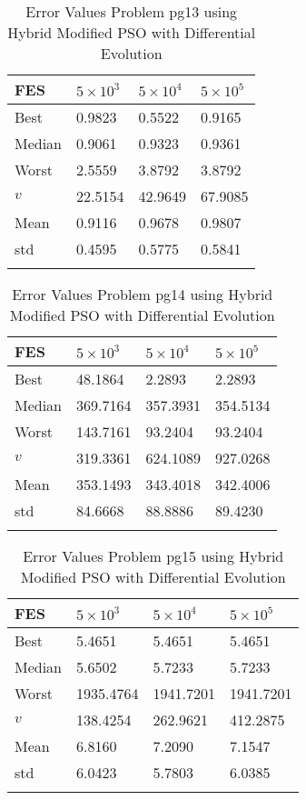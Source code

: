 \documentclass[10pt, a4paper]{book}
\begin{document}
\begin{center}
\begin{longtable}{l l l l}
FES & $5 \times 10^{3}$ & $5 \times 10^{4}$ & $5 \times 10^{5}$ \\
\hline
Best & 0.9823 & 0.5522 & 0.9165 \\
Median & 0.9061 & 0.9323 & 0.9361 \\
Worst & 2.5559 & 3.8792 & 3.8792 \\
$v$ & 22.5154 & 42.9649 & 67.9085 \\
Mean & 0.9116 & 0.9678 & 0.9807 \\
std & 0.4595 & 0.5775 & 0.5841 \\
\caption{ Error Values Problem pg13 using Hybrid Modified PSO with Differential Evolution }
\end{longtable}
\end{center}

\begin{center}
\begin{longtable}{l l l l}
FES & $5 \times 10^{3}$ & $5 \times 10^{4}$ & $5 \times 10^{5}$ \\
\hline
Best & 48.1864 & 2.2893 & 2.2893 \\
Median & 369.7164 & 357.3931 & 354.5134 \\
Worst & 143.7161 & 93.2404 & 93.2404 \\
$v$ & 319.3361 & 624.1089 & 927.0268 \\
Mean & 353.1493 & 343.4018 & 342.4006 \\
std & 84.6668 & 88.8886 & 89.4230 \\
\caption{ Error Values Problem pg14 using Hybrid Modified PSO with Differential Evolution }
\end{longtable}
\end{center}

\begin{center}
\begin{longtable}{l l l l}
FES & $5 \times 10^{3}$ & $5 \times 10^{4}$ & $5 \times 10^{5}$ \\
\hline
Best & 5.4651 & 5.4651 & 5.4651 \\
Median & 5.6502 & 5.7233 & 5.7233 \\
Worst & 1935.4764 & 1941.7201 & 1941.7201 \\
$v$ & 138.4254 & 262.9621 & 412.2875 \\
Mean & 6.8160 & 7.2090 & 7.1547 \\
std & 6.0423 & 5.7803 & 6.0385 \\
\caption{ Error Values Problem pg15 using Hybrid Modified PSO with Differential Evolution }
\end{longtable}
\end{center}
\end{document}
